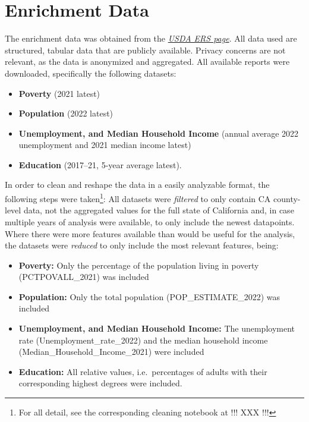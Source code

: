 

\section{Enrichment Data}\label{sec:Enrichment_Data}


The enrichment data was obtained from the \textit{\href{https://www.ers.usda.gov/data-products/county-level-data-sets/}{USDA ERS page}}. All data used are structured, tabular data that are publicly available. Privacy concerns are not relevant, as the data is anonymized and aggregated. All available reports were downloaded, specifically the following datasets:

\begin{itemize}
    \item \textbf{Poverty} (2021 latest)
    \item \textbf{Population} (2022 latest)
    \item \textbf{Unemployment, and Median Household Income} (annual average 2022 unemployment and 2021 median income latest)
    \item \textbf{Education} (2017–21, 5-year average latest).
\end{itemize}

In order to clean and reshape the data in a easily analyzable format, the following steps were taken\footnote{For all detail, see the corresponding cleaning notebook at !!! XXX !!!}:
All datasets were \textit{filtered} to only contain CA county-level data, not the aggregated values for the full state of California and, in case multiple years of analysis were available, to only include the newest datapoints. 
Where there were more features available than would be useful for the analysis, the datasets were \textit{reduced} to only include the most relevant features, being:

\begin{itemize}
    \item \textbf{Poverty:} Only the percentage of the population living in poverty (PCTPOVALL\_2021) was included
    \item \textbf{Population:} Only the total population (POP\_ESTIMATE\_2022) was included
    \item \textbf{Unemployment, and Median Household Income:} The unemployment rate (Unemployment\_rate\_2022) and the median household income (Median\_Household\_Income\_2021) were included
    \item \textbf{Education:} All relative values, i.e.\ percentages of adults with their corresponding highest degrees were included.
\end{itemize}

